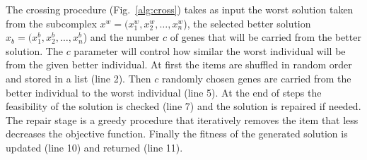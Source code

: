 The crossing procedure (Fig.~\ref{alg:cross}) takes as input the worst
solution taken from the subcomplex $x^w = (x^w_1, x^w_2, \ldots, x^w_n$),
the selected better solution $x_b = (x^b_1, x^b_2, \ldots, x^b_n$)
and the number $c$ of genes that will be carried from the better solution.
The $c$ parameter will control how similar the worst individual will be from the
given better individual.
At first the items are shuffled in random order and stored in a list (line 2).
Then $c$ randomly chosen genes are carried from the better individual to the worst
individual (line 5).
At the end of steps the feasibility of the solution is checked (line 7) and
the solution is repaired if needed.
The repair stage is a greedy procedure that iteratively removes the item that less
decreases the objective function.
Finally the fitness of the generated solution is updated (line 10) and
returned (line 11).


